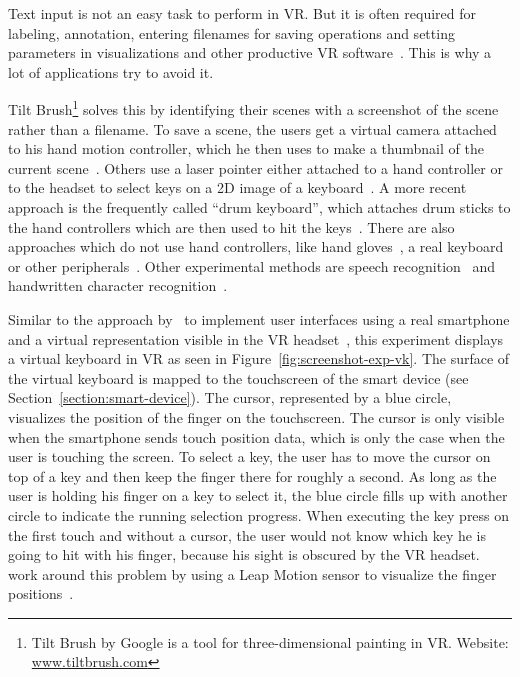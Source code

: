 Text input is not an easy task to perform in \ac{VR}. But it is often required for labeling, annotation, entering filenames for saving operations and setting parameters in visualizations and other productive \ac{VR} software~\cite[2154]{Rhoton.2002}. This is why a lot of applications try to avoid it. 

Tilt Brush\footnote{Tilt Brush by Google is a tool for three-dimensional painting in VR. Website: \href{https://www.tiltbrush.com/}{www.tiltbrush.com}} solves this by identifying their scenes with a screenshot of the scene rather than a filename. To save a scene, the users get a virtual camera attached to his hand motion controller, which he then uses to make a thumbnail of the current scene~\cite{GoogleLLC.2019}. %
Others use a laser pointer either attached to a hand controller or to the headset to select keys on a \ac{2D} image of a keyboard~\cite{WeelcoInc.2017}. A more recent approach is the frequently called \enquote{drum keyboard}, which attaches drum sticks to the hand controllers which are then used to hit the keys~\cite{Weisel.2017}. 
There are also approaches which do not use hand controllers, like hand gloves~\cite{Evans.1999,Rhoton.2002}, a real keyboard~\cite{McGill.2015,Walker.2017} or other peripherals~\cite[111\psq]{Gonzalez.2009}. Other experimental methods are speech recognition~\cite[2154\psqq]{Rhoton.2002} and handwritten character recognition~\cite[113]{Gonzalez.2009}.

Similar to the approach by~\citeauthor{Dias.2018} to implement user interfaces using a real smartphone and a virtual representation visible in the \ac{VR} headset~\cite[5]{Dias.2018}, this experiment displays a virtual keyboard in \ac{VR} as seen in Figure~\ref{fig:screenshot-exp-vk}. 
The surface of the virtual keyboard is mapped to the touchscreen of the smart device (see Section~\ref{section:smart-device}). The cursor, represented by a blue circle, visualizes the position of the finger on the touchscreen. The cursor is only visible when the smartphone sends touch position data, which is only the case when the user is touching the screen. To select a key, the user has to move the cursor on top of a key and then keep the finger there for roughly a second. As long as the user is holding his finger on a key to select it, the blue circle fills up with another circle to indicate the running selection progress. When executing the key press on the first touch and without a cursor, the user would not know which key he is going to hit with his finger, because his sight is obscured by the \ac{VR} headset. \citeauthor{Dias.2018} work around this problem by using a Leap Motion sensor to visualize the finger positions~\cite[4]{Dias.2018}.


